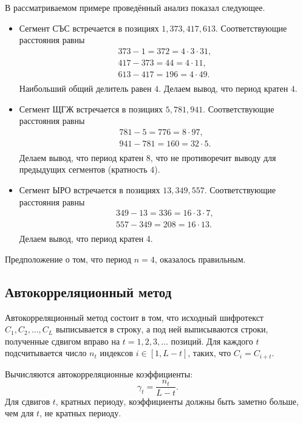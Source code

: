 В рассматриваемом примере проведённый анализ показал следующее.
\begin{itemize}
    \item Сегмент СЪС встречается в позициях $1, 373, 417, 613$. Соответствующие расстояния равны
        \[ \begin{array}{l}
            373 - 1 = 372 = 4 \cdot 3 \cdot 31, \\
            417 - 373= 44 = 4 \cdot 11, \\
            613 - 417 = 196 = 4 \cdot 49. \\
        \end{array} \]
        Наибольший общий делитель равен $4$. Делаем вывод, что период кратен $4$.
    \item Сегмент ЩГЖ встречается в позициях $5, 781, 941$. Соответствующие расстояния равны
        \[ \begin{array}{l}
            781 - 5 = 776 = 8 \cdot 97, \\
            941 - 781 = 160 = 32 \cdot 5. \\
        \end{array} \]
        Делаем вывод, что период кратен $8$, что не противоречит выводу для предыдущих сегментов (кратность $4$).
    \item Сегмент ЫРО встречается в позициях $13, 349, 557$. Соответствующие расстояния равны
        \[ \begin{array}{l}
            349 - 13 = 336 = 16 \cdot 3 \cdot 7, \\
            557 - 349 = 208 = 16 \cdot 13. \\
        \end{array} \]
        Делаем вывод, что период кратен 4.
\end{itemize}

Предположение о том, что период $n=4$, оказалось правильным.
\exampleend


\subsection{Автокорреляционный метод}

Автокорреляционный метод состоит в том, что исходный шифротекст $C_{1},C_{2}, \ldots, C_{L}$ выписывается в строку, а под ней выписываются строки, полученные сдвигом вправо на $t =1, 2, 3, \ldots$ позиций. Для каждого $t$ подсчитывается число $n_{t}$ индексов $i \in \left[ {1,L - t} \right]$, таких, что $C_i  = C_{i + t}$.

Вычисляются автокорреляционные коэффициенты:
    \[ \gamma_t  = \frac{n_t}{L - t}. \]
Для сдвигов $t$, кратных периоду, коэффициенты должны быть заметно больше, чем для $t$, не кратных периоду.

